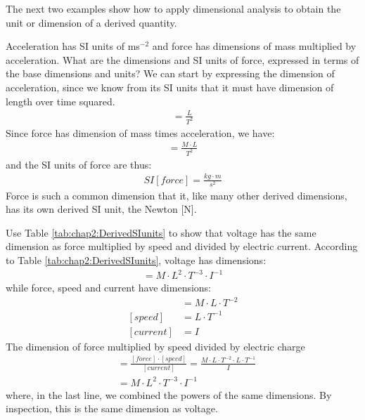 The next two examples show how to apply dimensional analysis to obtain the unit or dimension of a derived quantity. 

\begin{example}{Acceleration has SI units of ms$^{-2}$ and force has dimensions of mass multiplied by acceleration. What are the dimensions and SI units of force, expressed in terms of the base dimensions and units?}
We can start by expressing the dimension of acceleration, since we know from its SI units that it must have dimension of length over time squared.
\begin{align*}
[acceleration] = \frac{L}{T^2}
\end{align*}
Since force has dimension of mass times acceleration, we have:
\begin{align*}
[force] = \frac{M\cdot L}{T^2}
\end{align*}
and the SI units of force are thus:
\begin{align*}
SI[force] = \frac{kg \cdot m}{s^2}
\end{align*}
Force is such a common dimension that it, like many other derived dimensions, has its own derived SI unit, the Newton [N].
\end{example}

\begin{example}{Use Table \ref{tab:chap2:DerivedSIunits} to show that voltage has the same dimension as force multiplied by speed and divided by electric current.}
According to Table \ref{tab:chap2:DerivedSIunits}, voltage has dimensions:
\begin{align*}
[voltage]=M\cdot L^2 \cdot T^{-3}\cdot I^{-1}
\end{align*}
while force, speed and current have dimensions:
\begin{align*}
[force]&=M\cdot L\cdot T^{-2} \\
[speed]&=L\cdot T^{-1}\\
[current]&=I
\end{align*}
The dimension of force multiplied by speed divided by electric charge
\begin{align*}
[\frac{force\cdot speed}{current}]&=\frac{[force]\cdot [speed]}{[current]}=\frac{M\cdot L\cdot T^{-2} \cdot L\cdot T^{-1} }{I}\\
&=M\cdot L^2 \cdot T^{-3}\cdot I^{-1}
\end{align*}
where, in the last line, we combined the powers of the same dimensions. By inspection, this is the same dimension as voltage.
\end{example}

